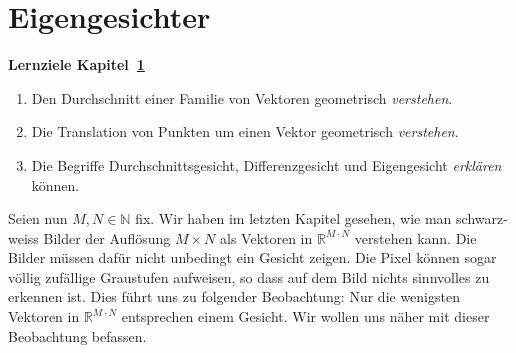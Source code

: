 \section{Eigengesichter} \label{sec:facespace}
\begin{tcolorbox}
	\centerline{\textbf{Lernziele Kapitel~\ref{sec:facespace}}}
	\begin{enumerate}[leftmargin=*,label=\thesection.\arabic*]
		\item Den Durchschnitt einer Familie von Vektoren geometrisch \textit{verstehen}.
		\item Die Translation von Punkten um einen Vektor geometrisch \textit{verstehen}.
		\item Die Begriffe Durchschnittsgesicht, Differenzgesicht und Eigengesicht \textit{erklären} können.
	\end{enumerate}
\end{tcolorbox}
Seien nun $M,N\in\mathbb N$ fix.
Wir haben im letzten Kapitel gesehen, wie man schwarz-weiss Bilder der Auflösung $M\times N$ als Vektoren in $\mathbb R^{M\cdot N}$ verstehen kann.
Die Bilder müssen dafür nicht unbedingt ein Gesicht zeigen.
Die Pixel können sogar völlig zufällige Graustufen aufweisen, so dass auf dem Bild nichts sinnvolles zu erkennen ist.
Dies führt uns zu folgender Beobachtung:
Nur die wenigsten Vektoren in $\mathbb R^{M\cdot N}$ entsprechen einem Gesicht.
Wir wollen uns näher mit dieser Beobachtung befassen.

